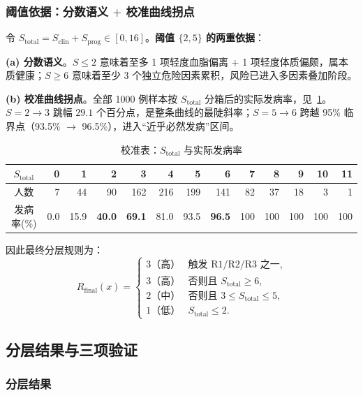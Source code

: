\documentclass{MathorCupmodeling}
\begin{document}
\subsubsection{阈值依据：分数语义 $+$ 校准曲线拐点}\label{sec:q2-threshold}

令 $S_{\text{total}} = S_{\text{clin}} + S_{\text{prog}} \in [0, 16]$。\textbf{阈值 $\{2, 5\}$ 的两重依据}：

\textbf{(a) 分数语义}。$S \le 2$ 意味着至多 1 项轻度血脂偏离 + 1 项轻度体质偏颇，属本质健康；$S \ge 6$ 意味着至少 3 个独立危险因素累积，风险已进入多因素叠加阶段。

\textbf{(b) 校准曲线拐点}。全部 1000 例样本按 $S_{\text{total}}$ 分箱后的实际发病率，见~\cref{tab:calibration}。$S{=}2 \to 3$ 跳幅 $29.1$ 个百分点，是整条曲线的最陡斜率；$S{=}5 \to 6$ 跨越 95\% 临界点（93.5\% $\to$ 96.5\%），进入``近乎必然发病''区间。

\begin{table}[H]
\centering\small
\caption{\texorpdfstring{校准表：$S_{\text{total}}$ 与实际发病率}{校准表：S\_total 与实际发病率}}\label{tab:calibration}
\begin{tabular}{@{}c r r r r r r r r r r r r@{}}
\toprule
$S_{\text{total}}$ & 0 & 1 & 2 & 3 & 4 & 5 & 6 & 7 & 8 & 9 & 10 & 11 \\
\midrule
人数 & 7 & 44 & 90 & 162 & 216 & 199 & 141 & 82 & 37 & 18 & 3 & 1 \\
发病率(\%) & 0.0 & 15.9 & \textbf{40.0} & \textbf{69.1} & 81.0 & 93.5 & \textbf{96.5} & 100 & 100 & 100 & 100 & 100 \\
\bottomrule
\end{tabular}
\end{table}

因此最终分层规则为：
\[
R_{\text{final}}(x) = \begin{cases}
  3\text{（高）} & \text{触发 R1/R2/R3 之一},\\
  3\text{（高）} & \text{否则且 } S_{\text{total}} \ge 6,\\
  2\text{（中）} & \text{否则且 } 3 \le S_{\text{total}} \le 5,\\
  1\text{（低）} & S_{\text{total}} \le 2.
\end{cases}
\]

\subsection{分层结果与三项验证}\label{sec:q2-validation}

\subsubsection{分层结果}
\end{document}
